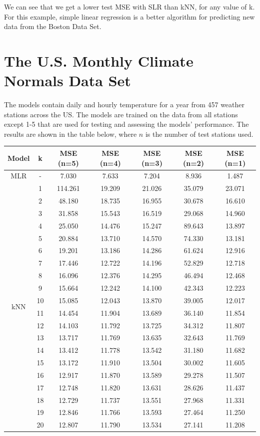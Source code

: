 \documentclass[]{article}
\begin{document}
We can see that we get a lower test MSE with SLR than kNN, for any value of k. For this example, simple linear regression is a better algorithm for predicting new data from the Boston Data Set.

\section{The U.S. Monthly Climate Normals Data Set}
The models contain daily and hourly temperature for a year from 457 weather stations across the US. The models are trained on the data from all stations except 1-5 that are used for testing and assessing the models' performance. The results are shown in the table below, where $n$ is the number of test stations used.

\begin{center}
\begin{tabular}{c|c|c|c|c|c|c}
Model & k & MSE (n=5) & MSE (n=4) & MSE (n=3) & MSE (n=2) & MSE (n=1)\\
\hline
MLR & - & 7.030 & 7.633 & 7.204 & 8.936 & 1.487\\
\hline
\multirow{20}{*}{kNN}
& 1 & 114.261 & 19.209 & 21.026 & 35.079 & 23.071\\
& 2 & 48.180 & 18.735 & 16.955 & 30.678 & 16.610\\
& 3 & 31.858 & 15.543 & 16.519 & 29.068 & 14.960\\
& 4 & 25.050 & 14.476 & 15.247 & 89.643 & 13.897\\
& 5 & 20.884 & 13.710 & 14.570 & 74.330 & 13.181\\
& 6 & 19.201 & 13.186 & 14.286 & 61.624 & 12.916\\
& 7 & 17.446 & 12.722 & 14.196 & 52.829 & 12.718\\
& 8 & 16.096 & 12.376 & 14.295 & 46.494 & 12.468\\
& 9 & 15.664 & 12.242 & 14.100 & 42.343 & 12.223\\
& 10 & 15.085 & 12.043 & 13.870 & 39.005 & 12.017\\
& 11 & 14.454 & 11.904 & 13.689 & 36.140 & 11.854\\
& 12 & 14.103 & 11.792 & 13.725 & 34.312 & 11.807\\
& 13 & 13.717 & 11.769 & 13.635 & 32.643 & 11.769\\
& 14 & 13.412 & 11.778 & 13.542 & 31.180 & 11.682\\
& 15 & 13.172 & 11.910 & 13.504 & 30.002 & 11.605\\
& 16 & 12.917 & 11.870 & 13.589 & 29.278 & 11.507\\
& 17 & 12.748 & 11.820 & 13.631 & 28.626 & 11.437\\
& 18 & 12.729 & 11.737 & 13.551 & 27.968 & 11.331\\
& 19 & 12.846 & 11.766 & 13.593 & 27.464 & 11.250\\
& 20 & 12.807 & 11.790 & 13.534 & 27.141 & 11.208\\
\end{tabular}
\end{center}
\end{document}
